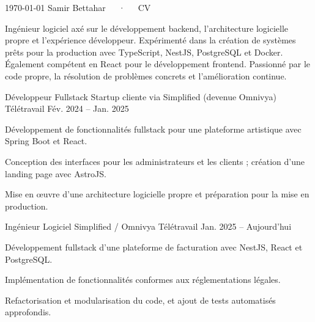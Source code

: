 \documentclass[11pt, a4paper]{awesome-cv}
\begin{document}
\makecvheader[C]
\makecvfooter
  {\today}
  {Samir Bettahar~~~·~~~CV}
  {\thepage}


\begin{cvparagraph}
Ingénieur logiciel axé sur le développement backend, l'architecture logicielle propre et l'expérience développeur. Expérimenté dans la création de systèmes prêts pour la production avec TypeScript, NestJS, PostgreSQL et Docker. Également compétent en React pour le développement frontend. Passionné par le code propre, la résolution de problèmes concrets et l'amélioration continue.
\end{cvparagraph}

\begin{cventries}

  \cventry
    {Développeur Fullstack}
    {Startup cliente via Simplified (devenue Omnivya)}
    {Télétravail}
    {Fév. 2024 -- Jan. 2025}
    {
      \begin{cvitems}
        \item {Développement de fonctionnalités fullstack pour une plateforme artistique avec Spring Boot et React.}
        \item {Conception des interfaces pour les administrateurs et les clients ; création d'une landing page avec AstroJS.}
        \item {Mise en œuvre d'une architecture logicielle propre et préparation pour la mise en production.}
      \end{cvitems}
    }

  \vspace{1.2em}

  \cventry
    {Ingénieur Logiciel}
    {Simplified / Omnivya}
    {Télétravail}
    {Jan. 2025 -- Aujourd'hui}
    {
      \begin{cvitems}
        \item {Développement fullstack d'une plateforme de facturation avec NestJS, React et PostgreSQL.}
        \item {Implémentation de fonctionnalités conformes aux réglementations légales.}
        \item {Refactorisation et modularisation du code, et ajout de tests automatisés approfondis.}
      \end{cvitems}
    }

\end{cventries}
\end{document}
